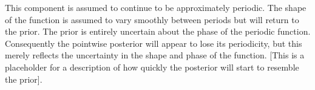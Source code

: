 This component is assumed to continue to be approximately periodic.
The shape of the function is assumed to vary smoothly between periods but will return to the prior.
The prior is entirely uncertain about the phase of the periodic function.
Consequently the pointwise posterior will appear to lose its periodicity, but this merely reflects the uncertainty in the shape and phase of the function.
[This is a placeholder for a description of how quickly the posterior will start to resemble the prior].